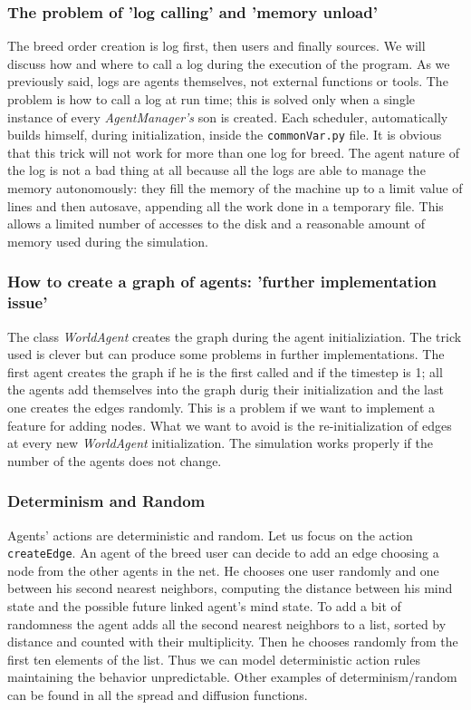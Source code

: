 \subsubsection{The problem of 'log calling' and 'memory unload'}
The breed order creation is log first, then users and finally sources.
We will discuss how and where to call a log during the execution of the program.
As we previously said, logs are agents themselves, not external functions
or tools. The problem is how to call a log at run time; this is solved
only when a single instance of every \textit{AgentManager's} son is
created. Each scheduler, automatically builds himself, during
initialization, inside the \texttt{commonVar.py} file.
It is obvious that this trick will not work for more than one log for breed.
The agent nature of the log is not a bad thing at all because all the logs are
able to manage the memory autonomously: they fill the memory of the machine
up to a limit value of lines and then autosave, appending all the work done
in a temporary file. This allows a limited number of accesses to the disk and
a reasonable amount of memory used during the simulation.

\subsubsection{How to create a graph of agents:
  'further implementation issue'}
The class \textit{WorldAgent} creates the graph during the agent
initializiation. The trick used is clever but can produce some
problems in further implementations. The first agent creates the graph
if he is the first called and if the timestep is 1; all the
agents add themselves into the graph durig their initialization
and the last one creates the edges randomly.
This is a problem if we want to implement a feature for adding nodes.
What we want to avoid is the re-initialization of edges at every new
\textit{WorldAgent} initialization. The simulation works properly if the
number of the agents does not change.

\subsubsection{Determinism and Random}
Agents' actions are deterministic and random.
Let us focus on the action \texttt{createEdge}.
An agent of the breed user can decide to add an edge choosing a node
from the other agents in the net.
He chooses one user randomly and one between his second nearest neighbors,
computing the distance between his mind state and the
possible future linked agent's mind state. To add a bit of randomness
the agent adds all the second nearest neighbors to a list,
sorted by distance and counted with their multiplicity.
Then he chooses randomly from the first ten
elements of the list. Thus we can model deterministic action rules
maintaining the behavior unpredictable.
Other examples of determinism/random can be found in all the spread
and diffusion functions. 

